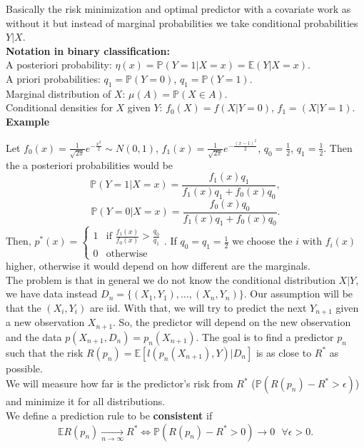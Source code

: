 \documentclass[11pt, english]{article}
\begin{document}
Basically the risk minimization and optimal predictor with a covariate work as without it but instead of marginal probabilities we take conditional probabilities $Y|X$.\\

\textbf{Notation in binary classification:\\}
A posteriori probability: $\eta(x)=\mathbb{P}(Y=1|X=x)=\mathbb{E}(Y|X=x)$.\\
A priori probabilities: $q_1=\mathbb{P}(Y=0)$, $q_1=\mathbb{P}(Y=1)$.\\
Marginal distribution of $X$: $\mu(A)=\mathbb{P}(X\in A)$.\\
Conditional densities for $X$ given $Y$: $f_0(X)=f(X|Y=0)$, $f_1=(X|Y=1)$.\\

\textbf{Example\\}

Let $f_0(x)=\frac{1}{\sqrt{2\pi}}e^{-\frac{x^2}{2}}\sim N(0,1)$, $f_1(x)=\frac{1}{\sqrt{2\pi}}e^{-\frac{(x-1)^2}{2}}$, $q_0=\frac{1}{2}$, $q_1=\frac{1}{2}$. Then the a posteriori probabilities would be
$$\mathbb{P}(Y=1|X=x)=\frac{f_1(x)q_1}{f_1(x)q_1+f_0(x)q_0},$$
$$\mathbb{P}(Y=0|X=x)=\frac{f_0(x)q_0}{f_1(x)q_1+f_0(x)q_0}.$$
Then, $p^*(x)=\left\{\begin{array}{ll}
1 & \text{if }\frac{f_1(x)}{f_0(x)}>\frac{q_0}{q_1}\\
0 & \text{otherwise}
\end{array}\right.$. If $q_0=q_1=\frac{1}{2}$ we choose the $i$ with $f_i(x)$ higher, otherwise it would depend on how different are the marginals.\\

The problem is that in general we do not know the conditional distribution $X|Y$, we have data instead $D_n=\{(X_1,Y_1),\dots,(X_n,Y_n)\}$. Our assumption will be that the $(X_i,Y_i)$ are iid. With that, we will try to predict the next $Y_{n+1}$ given a new observation $X_{n+1}$. So, the predictor will depend on the new observation and the data $p(X_{n+1},D_n)=p_n(X_{n+1})$. The goal is to find a predictor $p_n$ such that the risk $R(p_n)=\mathbb{E}[l(p_n(X_{n+1}),Y)|D_n]$ is as close to $R^*$ as possible. \\
We will measure how far is the predictor's risk from $R^*$ ($\mathbb{P}(R(p_n)-R^*>\epsilon)$) and minimize it for all distributions.\\

We define a prediction rule to be \textbf{consistent} if $$\mathbb{E}R(p_n)\underset{n\rightarrow\infty}{\longrightarrow} R^*\Leftrightarrow \mathbb{P}(R(p_n)-R^*>0)\rightarrow 0\text{ }\forall \epsilon>0.$$
\end{document}
